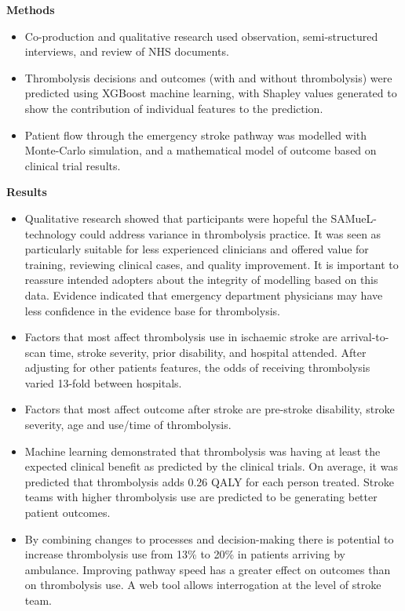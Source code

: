\textbf{Methods}

\begin{itemize}

    \item Co-production and qualitative research used observation, semi-structured interviews, and review of NHS documents.

    \item  Thrombolysis decisions and outcomes (with and without thrombolysis) were predicted using XGBoost machine learning, with Shapley values  generated to show the contribution of individual features to the prediction.

    \item Patient flow through the emergency stroke pathway was modelled with Monte-Carlo simulation, and a mathematical model of outcome based on  clinical trial results.
    
\end{itemize}

\textbf{Results}

\begin{itemize}

    \item Qualitative research showed that participants were hopeful the SAMueL-technology could address variance in thrombolysis practice. It was seen as particularly suitable for less experienced clinicians and offered value for training, reviewing clinical cases, and quality improvement. It is important to reassure intended adopters about the integrity of modelling based on this data. Evidence indicated that emergency department physicians may have less confidence in the evidence base for thrombolysis.
    
    \item Factors that most affect thrombolysis use in ischaemic stroke are arrival-to-scan time, stroke severity, prior disability, and hospital attended. After adjusting for other patients features, the odds of receiving thrombolysis varied 13-fold between hospitals.

    \item Factors that most affect outcome after stroke are pre-stroke disability, stroke severity, age and use/time of thrombolysis.
    
    \item Machine learning demonstrated that thrombolysis was having at least the expected clinical benefit as predicted by the clinical trials. On average, it was predicted that thrombolysis adds 0.26 QALY for each person treated. Stroke teams with higher thrombolysis use are predicted to be generating better patient outcomes.

    \item By combining changes to processes and decision-making there is potential to increase thrombolysis use from 13\% to 20\% in patients arriving by ambulance. Improving pathway speed has a greater effect on outcomes than on thrombolysis use. A web tool allows interrogation at the level of stroke team.
\end{itemize}

